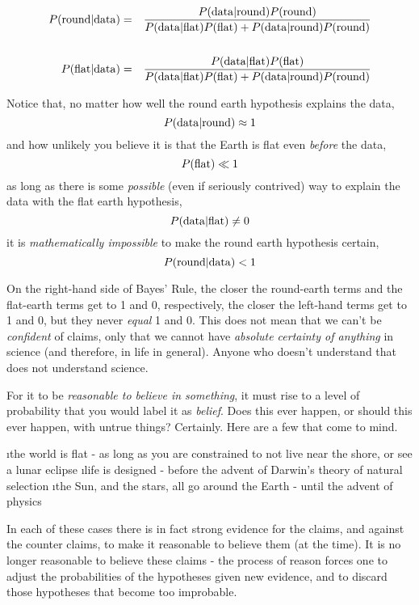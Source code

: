 \begin{eqnarray*}
P({\rm round}|{\rm data}) &=& \frac{P({\rm data}|{\rm round})P({\rm round})}{P({\rm data}|{\rm flat})P({\rm flat})+P({\rm data}|{\rm round})P({\rm round})}\\\\
P({\rm flat}|{\rm data}) &=& \frac{P({\rm data}|{\rm flat})P({\rm flat})}{P({\rm data}|{\rm flat})P({\rm flat})+P({\rm data}|{\rm round})P({\rm round})} 
\end{eqnarray*}

Notice that, no matter how well the round earth hypothesis explains the
data, \[P({\rm data}|{\rm round})\approx 1\] and how unlikely you
believe it is that the Earth is flat even \emph{before} the data,
\[P({\rm flat})\ll 1\] as long as there is some \emph{possible} (even if
seriously contrived) way to explain the data with the flat earth
hypothesis, \[P({\rm data}|{\rm flat}) \neq 0\] it is
\emph{mathematically impossible} to make the round earth hypothesis
certain, \[P({\rm round}|{\rm data})< 1\]

On the right-hand side of Bayes' Rule, the closer the round-earth terms
and the flat-earth terms get to 1 and 0, respectively, the closer the
left-hand terms get to 1 and 0, but they never \emph{equal} 1 and 0.
This does not mean that we can't be \emph{confident} of claims, only
that we cannot have \emph{absolute certainty of anything} in science
(and therefore, in life in general). Anyone who doesn't understand that
does not understand science.

For it to be {\em reasonable to believe in something}, it must rise to a level of probability that you would label it as {\em belief}.  Does this ever happen, or should this ever happen, with untrue things?  Certainly.  Here are a few that come to mind.

\be
\i the world is flat - as long as you are constrained to not live near the shore, or see a lunar eclipse
\i life is designed - before the advent of Darwin's theory of natural selection
\i the Sun, and the stars, all go around the Earth - until the advent of physics
\ee

In each of these cases there is in fact strong evidence for the claims, and against the counter claims, to make it reasonable to believe them (at the time).  It is no longer reasonable to believe these claims - the process of reason forces one to adjust the probabilities of the hypotheses given new evidence, and to discard those hypotheses that become too improbable.

